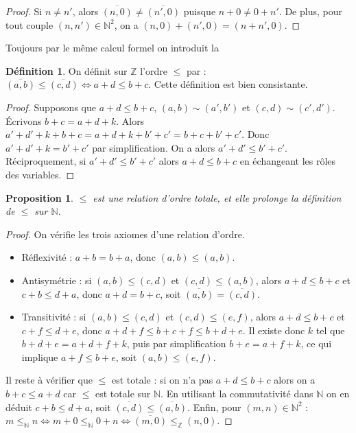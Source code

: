 \documentclass[french]{book}
\theoremstyle{plain}
\newtheorem{prop}{Proposition}[chapter]
\theoremstyle{definition}
\newtheorem{dfn}{Définition}[chapter]
\theoremstyle{remark}
\begin{document}
\begin{proof}
	Si $n \neq n'$, alors $\overline{(n,0)} \neq \overline{(n',0)}$ puisque $n+0 \neq 0+n'$. De plus, pour tout couple $(n,n') \in \mathbb{N}^2$, on a $(n,0) + (n',0) = (n+n',0)$.
\end{proof}
Toujours par le même calcul formel on introduit la 
\begin{dfn}
	On définit sur $\mathbb{Z}$ l'ordre $\leqslant$ par : $\overline{(a,b)} \leqslant \overline{(c,d)} \Leftrightarrow a+d \leqslant b+c$. Cette définition est bien consistante.
\end{dfn}
\begin{proof}
	Supposons que $a+d \leqslant b+c$, $(a,b) \sim (a',b')$ et $(c,d) \sim (c',d')$. Écrivons $b+c = a+d+k$. Alors $a'+d'+k+b+c = a+d+k+b'+c' = b+c+b'+c'$. Donc $a'+d'+k = b'+c'$ par simplification. On a alors $a'+d' \leqslant b'+c'$. Réciproquement, si $a'+d' \leqslant b'+c'$ alors $a+d \leqslant b+c$ en échangeant les rôles des variables.
\end{proof}
\begin{prop}
	$\leqslant$ est une relation d'ordre totale, et elle prolonge la définition de $\leqslant$ sur $\mathbb{N}$.
\end{prop}
\begin{proof}
	On vérifie les trois axiomes d'une relation d'ordre.
	\begin{itemize}
		\item Réflexivité : $a+b = b+a$, donc $(a,b) \leqslant (a,b)$.
		\item Antisymétrie : si $(a,b) \leqslant (c,d)$ et $(c,d) \leqslant (a,b)$, alors $a+d \leqslant b+c$ et $c+b \leqslant d+a$, donc $a+d = b+c$, soit $\overline{(a,b)} = \overline{(c,d)}$.
		\item Transitivité : si $(a,b) \leqslant (c,d)$ et $(c,d) \leqslant (e,f)$, alors $a+d \leqslant b+c$ et $c+f \leqslant d+e$, donc $a+d+f \leqslant b+c+f \leqslant b+d+e$. Il existe donc $k$ tel que $b+d+e = a+d+f+k$, puis par simplification $b+e = a+f+k$, ce qui implique $a+f \leqslant b+e$, soit $(a,b) \leqslant (e,f)$.
	\end{itemize}
	Il reste à vérifier que $\leqslant$ est totale : si on n'a pas $a+d \leqslant b+c$ alors on a $b+c \leqslant a+d$ car $\leqslant$ est totale sur $\mathbb{N}$. En utilisant la commutativité dans $\mathbb{N}$ on en déduit $c+b \leqslant d+a$, soit $\overline{(c,d)} \leqslant \overline{(a,b)}$. Enfin, pour $(m,n) \in \mathbb{N}^2$ : $m \leqslant_{\mathbb{N}} n \Leftrightarrow m+0 \leqslant_{\mathbb{N}} 0+n \Leftrightarrow \overline{(m,0)} \leqslant_{\mathbb{Z}} (n,0)$.
\end{proof}
\end{document}
